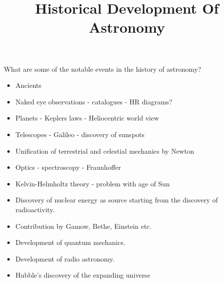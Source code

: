 \documentclass{../template/texnote}
\title{Historical Development Of Astronomy}
\begin{document}
    \maketitle {}
What are some of the notable events in the history of astronomy?
    \begin{itemize}
	\item Ancients
	\item Naked eye observations - catalogues - HR diagrams? 
	\item Planets - Keplers laws - Heliocentric world view
	\item Telescopes - Galileo - discovery of sunspots
	\item Unification of terrestrial and celestial mechanics by Newton
	\item Optics - spectroscopy - Fraunhoffer
	\item Kelvin-Helmholtz theory - problem with age of Sun
	\item Discovery of nuclear energy as source starting from the discovery of radioactivity.
	\item Contribution by Gamow, Bethe, Einstein etc. 
	\item Development of quantum mechanics.
	\item Development of radio astronomy.
	\item Hubble's discovery of the expanding universe
    \end{itemize}
    \printbibliography
\end{document}
